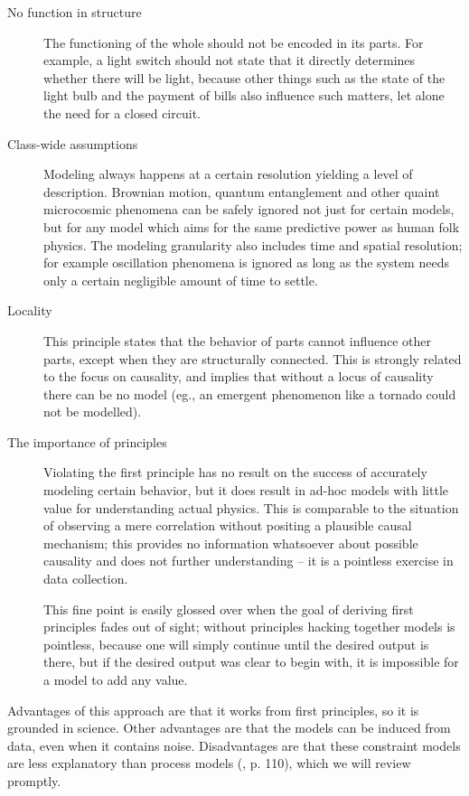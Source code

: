 \documentclass{article} %
\begin{document}
\begin{description}
	\item[No function in structure]
		The functioning of the whole should not be encoded in its
		parts. For example, a light switch should not state that it
		directly determines whether there will be light, because other
		things such as the state of the light bulb and the payment of
		bills also influence such matters, let alone the need for a
		closed circuit.

	\item[Class-wide assumptions]
		Modeling always happens at a certain resolution yielding a
		level of description. Brownian motion, quantum entanglement
		and other quaint microcosmic phenomena can be safely ignored
		not just for certain models, but for any model which aims for
		the same predictive power as human folk physics. The modeling
		granularity also includes time and spatial resolution; for
		example oscillation phenomena is ignored as long as the system
		needs only a certain negligible amount of time to settle.
	
	\item[Locality]
		This principle states that the behavior of parts cannot
		influence other parts, except when they are structurally
		connected. This is strongly related to the focus on causality,
		and implies that without a locus of causality there can be no
		model (eg., an emergent phenomenon like a tornado could not be
		modelled).

	\item[The importance of principles]
		Violating the first principle has no result on the success
		of accurately modeling certain behavior, but it does result in
		ad-hoc models with little value for understanding actual
		physics. This is comparable to the situation of observing a
		mere correlation without positing a plausible causal mechanism;
		this provides no information whatsoever about possible
		causality and does not further understanding -- it is a
		pointless exercise in data collection.

		This fine point is easily glossed over when the goal of
		deriving first principles fades out of sight; without
		principles hacking together models is pointless, because one
		will simply continue until the desired output is there, but if
		the desired output was clear to begin with, it is impossible
		for a model to add any value.
\end{description}

Advantages of this approach are that it works from first principles, so it is
grounded in science. Other advantages are that the models can be induced from
data, even when it contains noise. Disadvantages are that these constraint
models are less explanatory than process models (\cite{forbus}, p. 110), 
which we will review promptly.
\end{document}
